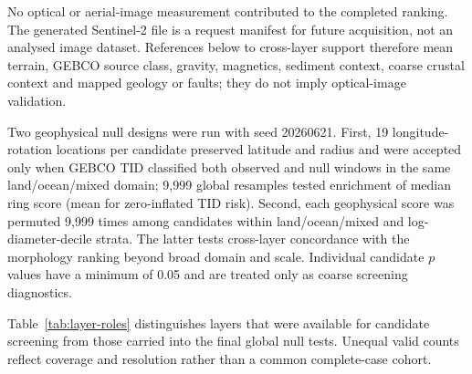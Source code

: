 \documentclass[11pt]{article}
\begin{document}
No optical or aerial-image measurement contributed to the completed ranking. The generated Sentinel-2 file is a request manifest for future acquisition, not an analysed image dataset. References below to cross-layer support therefore mean terrain, GEBCO source class, gravity, magnetics, sediment context, coarse crustal context and mapped geology or faults; they do not imply optical-image validation.

Two geophysical null designs were run with seed 20260621. First, 19 longitude-rotation locations per candidate preserved latitude and radius and were accepted only when GEBCO TID classified both observed and null windows in the same land/ocean/mixed domain; 9,999 global resamples tested enrichment of median ring score (mean for zero-inflated TID risk). Second, each geophysical score was permuted 9,999 times among candidates within land/ocean/mixed and log-diameter-decile strata. The latter tests cross-layer concordance with the morphology ranking beyond broad domain and scale. Individual candidate $p$ values have a minimum of 0.05 and are treated only as coarse screening diagnostics.

Table~\ref{tab:layer-roles} distinguishes layers that were available for candidate screening from those carried into the final global null tests. Unequal valid counts reflect coverage and resolution rather than a common complete-case cohort.

\begin{table}[H]
\centering
\caption{Role and coverage of the completed screening layers. Candidate-metric counts precede the stricter coverage and resolution checks used by each null.}
\label{tab:layer-roles}
\scriptsize
{}
\end{table}
\end{document}
